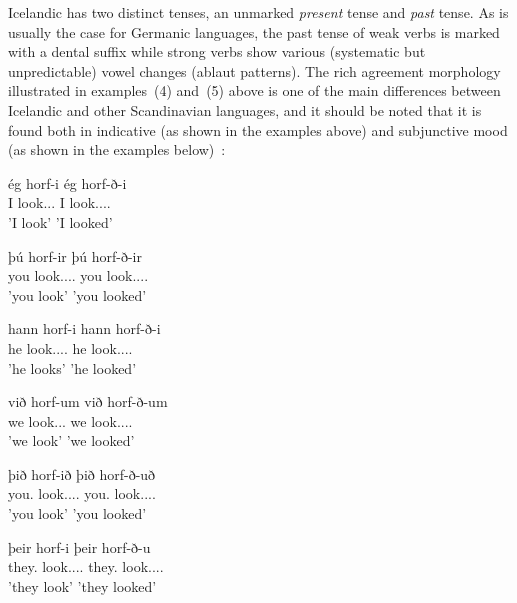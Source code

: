 \documentclass[12pt,%
    times,
]{lin-v2/lin}
\begin{document}
Icelandic has two distinct tenses, an unmarked \emph{present} tense and \emph{past} tense.
As is usually the case for Germanic languages, the past tense of weak verbs is marked with a dental suffix
while strong verbs show various (systematic but unpredictable) vowel changes (ablaut patterns).
The rich agreement morphology illustrated in examples~(4) and~(5) above is one of the main
differences between Icelandic and other Scandinavian languages, and it should be noted
that it is found both in indicative (as shown in the examples above) and subjunctive mood
(as shown in the examples below)~\citep{icelandic}:
\begin{exe}
    \ex \begin{xlist}
        \item \gll ég horf-i ég horf-ð-i\\
                   I look.\First\Sg.\Prs.\Subj{} I look.\First.\Sg.\Pst.\Subj\\
              \trans 'I look' 'I looked'
        \item \gll þú horf-ir þú horf-ð-ir\\
                   you look.\Second.\Sg.\Prs.\Subj{} you look.\Second.\Sg.\Pst.\Subj\\
              \trans 'you look' 'you looked'
        \item \gll hann horf-i hann horf-ð-i\\
                   he look.\Third.\Sg.\Prs.\Subj{} he look.\Third.\Sg.\Pst.\Subj\\
                   \trans 'he looks' 'he looked'\\
        \item \gll við horf-um við horf-ð-um\\
                   we look.\First\Sg.\Prs.\Subj{} we look.\First.\Sg.\Pl.\Subj\\
              \trans 'we look' 'we looked'
        \item \gll þið horf-ið þið horf-ð-uð\\
                   you.\Pl{} look.\Second.\Sg.\Prs.\Subj{} you.\Pl{} look.\Second.\Pl.\Pst.\Subj\\
              \trans 'you look' 'you looked'
        \item \gll þeir horf-i þeir horf-ð-u\\
                   they.\M{} look.\Third.\Sg.\Prs.\Subj{} they.\M{} look.\Third.\Pl.\Pst.\Subj\\
              \trans 'they look' 'they looked'\\
        \end{xlist}
\end{exe}
\end{document}
